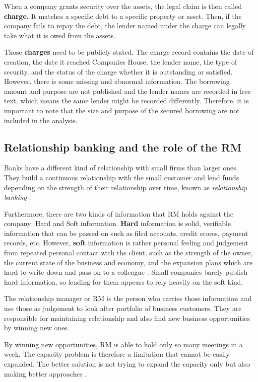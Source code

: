 \documentclass[ %
                    author={Natchalin Iwsakul \\ Inkaphol Siriwongwattana \\ Tanaphan Kummaraphat \\ Patorn Srisupap},
                supervisor={Fernando Moreno-Pino},
                    degree={MSc},
                     title={Propensity Modelling for SME Commercial Lending Using Open Public Data},
                  subtitle={Companies House filings and GDELT media coverage as predictors of first-time borrowing},
                      type={},
                      year={2026}]{dissertation}
\begin{document}
When a company grants security over the assets, the legal claim is then called \textbf{charge.} It matches a specific debt to a specific property or asset. Then, if the company fails to repay the debt, the lender named under the charge can legally take what it is owed from the assets.

Those \textbf{charges} need to be publicly stated. The charge record contains the date of creation, the date it reached Companies House, the lender name, the type of security, and the status of the charge whether it is outstanding or satisfied. However, there is some missing and abnormal information. The borrowing amount and purpose are not published and the lender names are recorded in free text, which means the same lender might be recorded differently. Therefore, it is important to note that the size and purpose of the secured borrowing are not included in the analysis.

\subsection{Relationship banking and the role of the RM}
\label{sec:rm}

Banks have a different kind of relationship with small firms than larger ones. They build a continuous relationship with the small customer and lend funds depending on the strength of their relationship over time, known as \textit{relationship banking} \cite{boot2000relationship}.

Furthermore, there are two kinds of information that RM holds against the company: Hard and Soft information. \textbf{Hard} information is solid, verifiable information that can be passed on such as filed accounts, credit scores, payment records, etc. However, \textbf{soft} information is rather personal feeling and judgement from repeated personal contact with the client, such as the strength of the owner, the current state of the business and economy, and the expansion plans which are hard to write down and pass on to a colleague \cite{berger2006complete}. Small companies barely publish hard information, so lending for them appears to rely heavily on the soft kind.

The relationship manager or RM is the person who carries those information and use those as judgement to look after portfolio of business customers. They are responsible for maintaining relationship and also find new business opportunities by winning new ones.

By winning new opportunities, RM is able to hold only so many meetings in a week. The capacity problem is therefore a limitation that cannot be easily expanded. The better solution is not trying to expand the capacity only but also making better approaches \cite{dhaen_model}.
\end{document}
